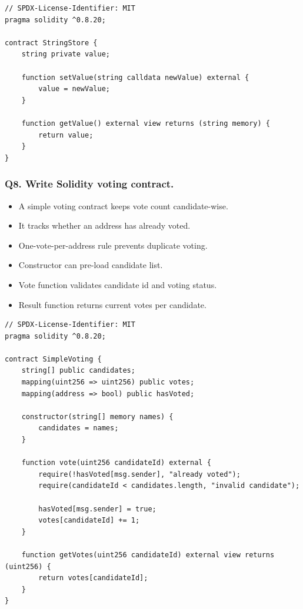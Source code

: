 \documentclass[12pt,a4paper]{article}
\begin{document}
\begin{lstlisting}
// SPDX-License-Identifier: MIT
pragma solidity ^0.8.20;

contract StringStore {
    string private value;

    function setValue(string calldata newValue) external {
        value = newValue;
    }

    function getValue() external view returns (string memory) {
        return value;
    }
}
\end{lstlisting}

\subsubsection*{Q8. Write Solidity voting contract.}
\begin{itemize}
\item A simple voting contract keeps vote count candidate-wise.
\item It tracks whether an address has already voted.
\item One-vote-per-address rule prevents duplicate voting.
\item Constructor can pre-load candidate list.
\item Vote function validates candidate id and voting status.
\item Result function returns current votes per candidate.
\end{itemize}

\begin{lstlisting}
// SPDX-License-Identifier: MIT
pragma solidity ^0.8.20;

contract SimpleVoting {
    string[] public candidates;
    mapping(uint256 => uint256) public votes;
    mapping(address => bool) public hasVoted;

    constructor(string[] memory names) {
        candidates = names;
    }

    function vote(uint256 candidateId) external {
        require(!hasVoted[msg.sender], "already voted");
        require(candidateId < candidates.length, "invalid candidate");

        hasVoted[msg.sender] = true;
        votes[candidateId] += 1;
    }

    function getVotes(uint256 candidateId) external view returns (uint256) {
        return votes[candidateId];
    }
}
\end{lstlisting}
\end{document}
